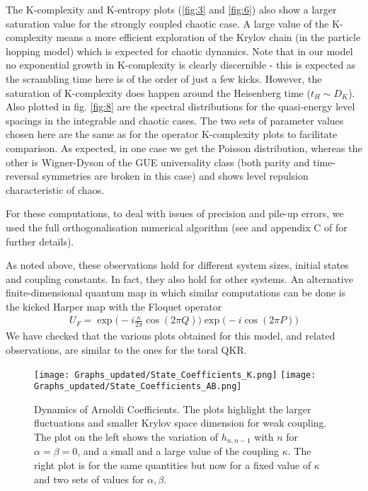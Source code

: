 \documentclass[a4paper,12pt]{article}
\begin{document}
The K-complexity and K-entropy plots (\ref{fig:3} and \ref{fig:6}) also show a larger saturation value for the strongly coupled chaotic case. A large value of the K-complexity means a more efficient exploration of the Krylov chain (in the particle hopping model) which is expected for chaotic dynamics. Note that in our model no exponential growth in K-complexity is clearly discernible - this is expected as the scrambling time here is of the order of just a few kicks. However, the saturation of K-complexity does happen around the Heisenberg time ($t_H \sim D_K $).  Also plotted in fig. \ref{fig:8} are the spectral distributions for the quasi-energy level spacings in the integrable and chaotic cases. The two sets of parameter values chosen here are the same as for the operator K-complexity plots to facilitate comparison. As expected, in one case we get the Poisson distribution, whereas the other is Wigner-Dyson of the GUE universality class (both parity and time-reversal symmetries are broken in this case) and shows level repulsion  characteristic of chaos.

For these computations, to deal with issues of precision and pile-up errors, we used the full orthogonalisation numerical algorithm (see \cite{parlett1998symmetric} and  appendix C of \cite{Rabinovici_2021} for further details). 

As noted above, these observations hold for different system sizes, initial states and coupling constants. In fact, they also hold for other systems. An alternative finite-dimensional quantum map in which similar computations can be done is the kicked Harper map with the Floquet operator
\begin{align}
U_F= \exp\big(-i \frac{\kappa}{2\pi} \cos (2\pi Q)\big)\exp\big(-i \cos (2 \pi P)\big)
\end{align}
We have checked that the various plots obtained for this model, and related observations, are similar to the ones for the toral QKR.


\begin{figure*}
    \centering
    \texttt{[image: Graphs\_updated/State\_Coefficients\_K.png]}
    \texttt{[image: Graphs\_updated/State\_Coefficients\_AB.png]}
    \caption{Dynamics of Arnoldi Coefficients. The plots highlight the larger fluctuations and smaller Krylov space dimension for weak coupling. The plot on the left shows the variation of $h_{n,n-1}$ with $n$ for $\alpha=\beta=0$, and a small and a large value of the coupling $\kappa$. The right plot is for the same quantities but now  for a fixed value of $\kappa$ and two sets of values for $\alpha, \beta$.}
    \label{fig:1}
\end{figure*}
\end{document}
